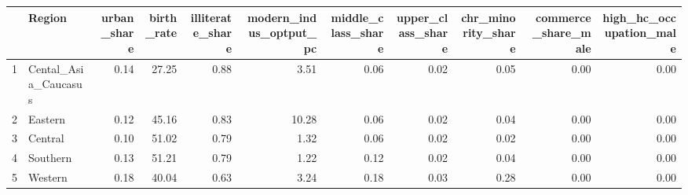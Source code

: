 \begin{table}[ht]
\centering
\begin{tabular}{rlrrrrrrrrr}
  \hline
 & Region & urban\_share & birth\_rate & illiterate\_share & modern\_indus\_optput\_pc & middle\_class\_share & upper\_class\_share & chr\_minority\_share & commerce\_share\_male & high\_hc\_occupation\_male \\ 
  \hline
1 & Cental\_Asia\_Caucasus & 0.14 & 27.25 & 0.88 & 3.51 & 0.06 & 0.02 & 0.05 & 0.00 & 0.00 \\ 
  2 & Eastern & 0.12 & 45.16 & 0.83 & 10.28 & 0.06 & 0.02 & 0.04 & 0.00 & 0.00 \\ 
  3 & Central & 0.10 & 51.02 & 0.79 & 1.32 & 0.06 & 0.02 & 0.02 & 0.00 & 0.00 \\ 
  4 & Southern & 0.13 & 51.21 & 0.79 & 1.22 & 0.12 & 0.02 & 0.04 & 0.00 & 0.00 \\ 
  5 & Western & 0.18 & 40.04 & 0.63 & 3.24 & 0.18 & 0.03 & 0.28 & 0.00 & 0.00 \\ 
   \hline
\end{tabular}
\end{table}
